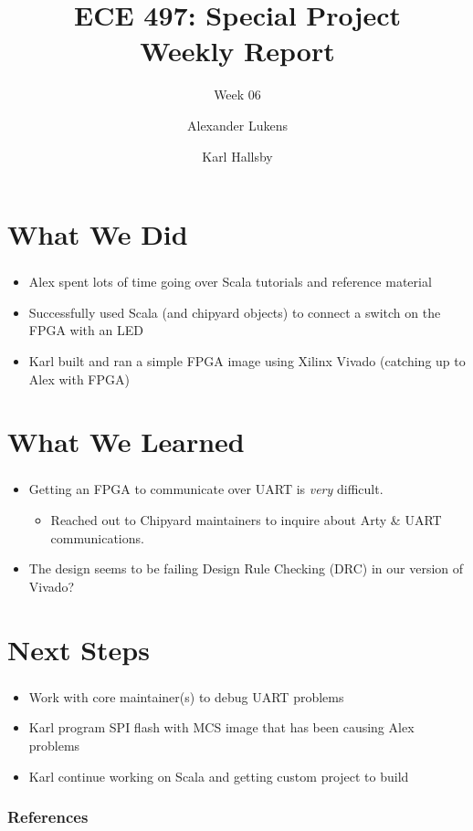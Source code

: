 \documentclass{../weeklyslides}
\title[Weekly Report]{ECE 497: Special Project \\ Weekly Report}
\subtitle{Week 06}
\author{Alexander Lukens \and Karl Hallsby}
\institute{Illinois Institute of Technology}
\date{\DTMdisplaydate{2021}{3}{4}{-1}}
\begin{document}
\nocite{chipyard}

\begin{frame}
  \titlepage{}
\end{frame}

\section{What We Did}\label{sec:What_We_Did}
\begin{frame}
  \frametitle{}
  \begin{itemize}
  \item Alex spent lots of time going over Scala tutorials and reference material
  \item Successfully used Scala (and chipyard objects) to connect a switch on the FPGA with an LED
  \item Karl built and ran a simple FPGA image using Xilinx Vivado (catching up to Alex with FPGA)
  \end{itemize}
\end{frame}

\section{What We Learned}\label{sec:What_We_Learned}
\begin{frame}
  \frametitle{}
  \begin{itemize}
  \item Getting an FPGA to communicate over UART is \emph{very} difficult.
    \begin{itemize}
    \item Reached out to Chipyard maintainers to inquire about Arty \& UART communications.
    \end{itemize}
  \item The design seems to be failing Design Rule Checking (DRC) in our version of Vivado?
  \end{itemize}
\end{frame}

\section{Next Steps}\label{sec:Next_Steps}
\begin{frame}
  \frametitle{}
  \begin{itemize}
  \item Work with core maintainer(s) to debug UART problems
  \item Karl program SPI flash with MCS image that has been causing Alex problems
  \item Karl continue working on Scala and getting custom project to build
  \end{itemize}
\end{frame}

\begin{frame}
  \frametitle{References}
  \printbibliography[heading=bibintoc]{}
\end{frame}
\end{document}
